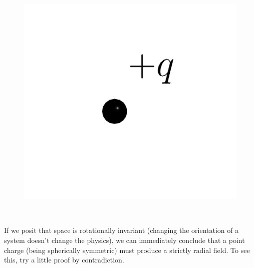 \documentclass{article}
\begin{document}
\begin{minipage}{0.3\textwidth}
\begin{figure}[H]
\centering
\includegraphics[width=\textwidth]{figures/2l1.png}
\end{figure}
\end{minipage}
~
\begin{minipage}{0.6\textwidth}
    If we posit that space is rotationally invariant (changing the orientation of a system doesn't change the physics), we can immediately conclude that a point charge (being spherically symmetric) must produce a strictly radial field. To see this, try a little proof by contradiction.
\end{minipage}
\end{document}
